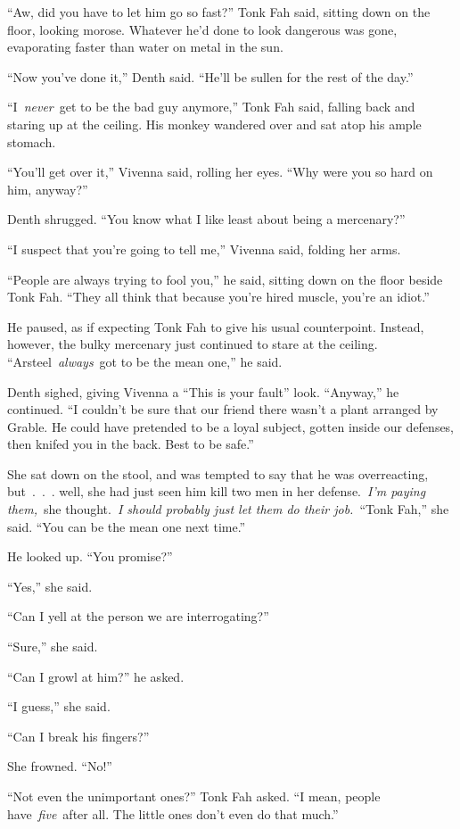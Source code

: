 “Aw, did you have to let him go so fast?” Tonk Fah said, sitting down on the floor, looking morose. Whatever he’d done to look dangerous was gone, evaporating faster than water on metal in the sun.

“Now you’ve done it,” Denth said. “He’ll be sullen for the rest of the day.”

“I~\textit{never}~get to be the bad guy anymore,” Tonk Fah said, falling back and staring up at the ceiling. His monkey wandered over and sat atop his ample stomach.

“You’ll get over it,” Vivenna said, rolling her eyes. “Why were you so hard on him, anyway?”

Denth shrugged. “You know what I like least about being a mercenary?”

“I suspect that you’re going to tell me,” Vivenna said, folding her arms.

“People are always trying to fool you,” he said, sitting down on the floor beside Tonk Fah. “They all think that because you’re hired muscle, you’re an idiot.”

He paused, as if expecting Tonk Fah to give his usual counterpoint. Instead, however, the bulky mercenary just continued to stare at the ceiling. “Arsteel~\textit{always}~got to be the mean one,” he said.

Denth sighed, giving Vivenna a “This is your fault” look. “Anyway,” he continued. “I couldn’t be sure that our friend there wasn’t a plant arranged by Grable. He could have pretended to be a loyal subject, gotten inside our defenses, then knifed you in the back. Best to be safe.”

She sat down on the stool, and was tempted to say that he was overreacting, but~.~.~. well, she had just seen him kill two men in her defense.~\textit{I’m paying them,}~she thought.~\textit{I should probably just let them do their job.}~“Tonk Fah,” she said. “You can be the mean one next time.”

He looked up. “You promise?”

“Yes,” she said.

“Can I yell at the person we are interrogating?”

“Sure,” she said.

“Can I growl at him?” he asked.

“I guess,” she said.

“Can I break his fingers?”

She frowned. “No!”

“Not even the unimportant ones?” Tonk Fah asked. “I mean, people have~\textit{five}~after all. The little ones don’t even do that much.”

